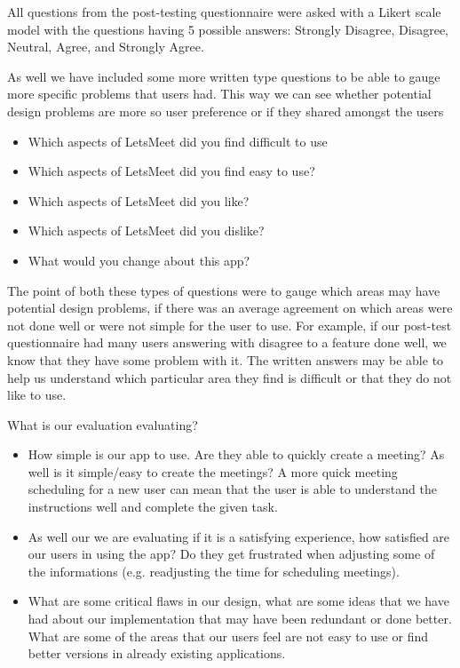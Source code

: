 \documentclass{sigchi}
\begin{document}
All questions from the post-testing questionnaire were asked with a Likert scale model with the questions having 5 possible answers: Strongly Disagree, Disagree, Neutral, Agree, and Strongly Agree.

As well we have included some more written type questions to be able to gauge more specific problems that users had. This way we can see whether potential design problems are more so user preference or if they shared amongst the users
\begin{itemize}
	\item Which aspects of LetsMeet did you find difficult to use
	\item Which aspects of LetsMeet did you find easy to use?
	\item Which aspects of LetsMeet did you like?
	\item Which aspects of LetsMeet did you dislike?
	\item What would you change about this app?
\end{itemize}

The point of both these types of questions were to gauge which areas may have potential design problems, if there was an average agreement on which areas were not done well or were not simple for the user to use. For example, if our post-test questionnaire had many users answering with disagree to a feature done well, we know that they have some problem with it. The written answers may be able to help us understand which particular area they find is difficult or that they do not like to use.

What is our evaluation evaluating?
\begin{itemize}
	\item How simple is our app to use. Are they able to quickly create a meeting? As well is it simple/easy to create the meetings? A more quick meeting scheduling for a new user can mean that the user is able to understand the instructions well and complete the given task.

	\item As well our we are evaluating if it is a satisfying experience, how satisfied are our users in using the app? Do they get frustrated when adjusting some of the informations (e.g. readjusting the time for scheduling meetings).

	\item What are some critical flaws in our design, what are some ideas that we have had about our implementation that may have been redundant or done better. What are some of the areas that our users feel are not easy to use or find better versions in already existing applications.
\end{itemize}
\end{document}
